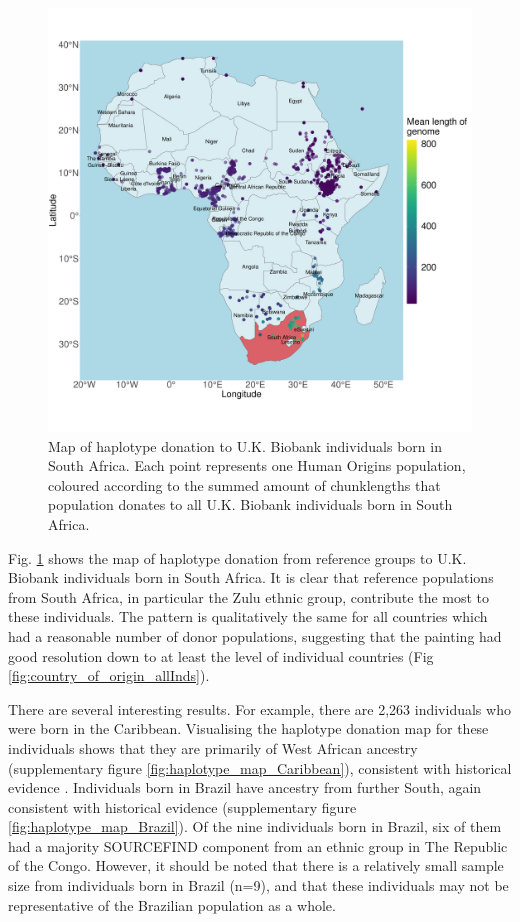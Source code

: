 \begin{figure}[htp]
    \centering
    \includegraphics[width=1.0\textwidth]{../images/chapter3/haplotype_map_SouthAfrica.pdf}
    \caption{Map of haplotype donation to U.K. Biobank individuals born in South Africa. Each point represents one Human Origins population, coloured according to the summed amount of chunklengths that population donates to all U.K. Biobank individuals born in South Africa. }
    \label{fig:haplotype_map_SouthAfrica}
\end{figure}

Fig. \ref{fig:haplotype_map_SouthAfrica} shows the map of haplotype donation from reference groups to U.K. Biobank individuals born in South Africa. It is clear that reference populations from South Africa, in particular the Zulu ethnic group, contribute the most to these individuals. The pattern is qualitatively the same for all countries which had a reasonable number of donor populations, suggesting that the painting had good resolution down to at least the level of individual countries (Fig \ref{fig:country_of_origin_allInds}).

There are several interesting results. For example, there are 2,263 individuals who were born in the Caribbean. Visualising the haplotype donation map for these individuals shows that they are primarily of West African ancestry (supplementary figure \ref{fig:haplotype_map_Caribbean}), consistent with historical evidence \cite{micheletti2020genetic}. Individuals born in Brazil have ancestry from further South, again consistent with historical evidence (supplementary figure \ref{fig:haplotype_map_Brazil}). Of the nine individuals born in Brazil, six of them had a majority SOURCEFIND component from an ethnic group in The Republic of the Congo. However, it should be noted that there is a relatively small sample size from individuals born in Brazil (n=9), and that these individuals may not be representative of the Brazilian population as a whole. 

